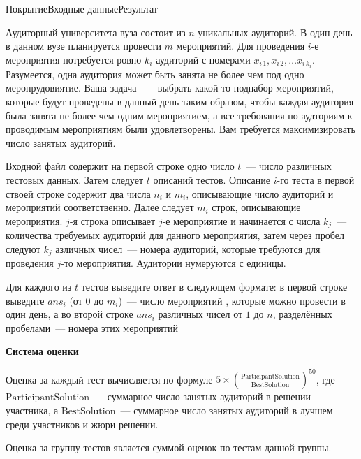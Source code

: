 

\begin{problem}{Покрытие}{Входные данные}{Результат}{}

Аудиторный университета вуза состоит из $n$ уникальных аудиторий. В один день в данном вузе планируется провести $m$ мероприятий. Для проведения $i$-е мероприятия потребуется ровно $k_i$ аудиторий с номерами $x_{i\, 1}, x_{i\, 2}, \ldots x_{i\, k_i}$. Разумеется, одна аудитория может быть занята не более чем под одно меропрудовиятие. Ваша задача ~--- выбрать какой-то поднабор мероприятий, которые будут проведены в данный день таким образом, чтобы каждая аудитория была занята не более чем одним мероприятием, а все требования по аудториям к проводимым мероприятиям были удовлетворены. Вам требуется максимизировать число занятых аудиторий.

\InputFile
Входной файл содержит на первой строке одно число $t$~--- число различных тестовых данных. Затем следует $t$ описаний тестов. Описание $i$-го теста в первой ствоей строке содержит два числа $n_i$ и $m_i$, описывающие число аудиторий и мероприятий соответственно. Далее следует $m_i$ строк, описывающие мероприятия. $j$-я строка описывает $j$-е мероприятие и начинается с числа $k_j$~--- количества требуемых аудиторий для данного мероприятия, затем через пробел следуют $k_j$ азличных чисел~--- номера аудиторий, которые требуются для проведения $j$-то мероприятия. Аудитории нумеруются с единицы. 

\OutputFile
Для каждого из $t$ тестов выведите ответ в следующем формате: в первой строке выведите $ans_i$ (от $0$ до $m_i$)~--- число мероприятий , которые можно провести в один день, а во второй строке $ans_i$ различных чисел от $1$ до $n$, разделённых пробелами~--- номера этих мероприятий


\Examples
\begin{example}
%
\end{example}

{\noindent\bf\problemsectionfont\textsf{Система оценки}}

Оценка за каждый тест вычисляется по формуле $5 \times\left(\frac{\text {ParticipantSolution}}{\text {BestSolution}}\right)^{50}$, где $\text{ParticipantSolution}$~--- суммарное число занятых аудиторий в решении участника, а $\text{BestSolution}$~--- суммарное число занятых аудиторий в лучшем среди участников и жюри решении.

Оценка за группу тестов является суммой оценок по тестам данной группы.


\end{problem}
